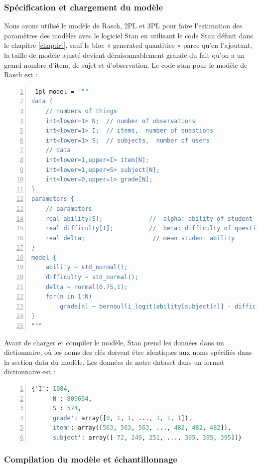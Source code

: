 \subsubsection{Spécification et chargement du modèle}
Nous avons utilisé le modèle de Rasch, 2PL et 3PL pour faire l’estimation des paramètres des modèles avec le logiciel Stan en utilisant le code Stan définit dans le chapitre \ref{chap:irt}, sauf le bloc « generated quantities » parce qu’en l'ajoutant, la taille de modèle ajusté devient déraisonnablement grande du fait qu’on a un grand nombre d’item, de sujet et d’observation. Le code stan pour le modèle de Rasch est :
\begin{lstlisting}[language=Stan,basicstyle=\scriptsize, frame=l,framesep=4.5mm,framexleftmargin=2.5mm,tabsize=2,numbers=left,fillcolor=\color{blueforest!70},rulecolor=\color{blueforest},numberstyle=\normalfont\tiny\color{white}]
_1pl_model = """
data {
	// numbers of things
	int<lower=1> N;  // number of observations
	int<lower=1> I;  // items,  number of questions  
	int<lower=1> S;  // subjects,  number of users 
	// data
	int<lower=1,upper=I> item[N];
	int<lower=1,upper=S> subject[N];
	int<lower=0,upper=1> grade[N];
}
parameters {
	// parameters
	real ability[S];             //  alpha: ability of student
	real difficulty[I];          //  beta: difficulty of question
	real delta;                   // mean student ability
}
model {
	ability ~ std_normal();         
	difficulty ~ std_normal();   
	delta ~ normal(0.75,1);
	for(n in 1:N)
		grade[n] ~ bernoulli_logit(ability[subject[n]] - difficulty[item[n]] + delta);
}
"""
\end{lstlisting}
Avant de charger et compiler le modèle, Stan prend les données dans un dictionnaire, où les noms des clés doivent être identiques aux noms spécifiés dans la section data du modèle. Les données de notre dataset dans un format dictionnaire est :

\begin{lstlisting}[language=Python,basicstyle=\scriptsize, frame=l,framesep=4.5mm,framexleftmargin=2.5mm,tabsize=2,numbers=left,fillcolor=\color{blueforest!70},rulecolor=\color{blueforest},numberstyle=\normalfont\tiny\color{white}]
	{'I': 1084,
 	 'N': 809694,
 	 'S': 574,
 	 'grade': array([0, 1, 1, ..., 1, 1, 1]),
 	 'item': array([563, 563, 563, ..., 482, 482, 482]),
 	 'subject': array([ 72, 249, 251, ..., 395, 395, 395])}
\end{lstlisting}

\subsubsection{Compilation du modèle et échantillonnage }

